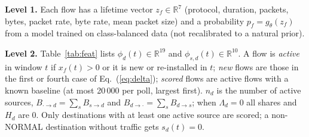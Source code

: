 \documentclass[conference]{IEEEtran}
\begin{document}
\textbf{Level 1.} Each flow has a lifetime vector $z_f\in\mathbb{R}^7$ (protocol, duration, packets, bytes, packet rate, byte rate, mean packet size) and a probability $p_f=g_\theta(z_f)$ from a model trained on class-balanced data (not recalibrated to a natural prior).

\textbf{Level 2.} Table~\ref{tab:feat} lists $\phi_d(t)\in\mathbb{R}^{19}$ and $\phi_{s,d}(t)\in\mathbb{R}^{10}$. A flow is \emph{active} in window $t$ if $x_f(t)>0$ or it is new or re-installed in $t$; \emph{new} flows are those in the first or fourth case of Eq.~(\ref{eq:delta}); \emph{scored} flows are active flows with a known baseline (at most 20\,000 per poll, largest first). $n_d$ is the number of active sources, $B_{\cdot\to d}=\sum_s B_{s\to d}$ and $B_{d\to\cdot}=\sum_s B_{d\to s}$; when $\Lambda_d=0$ all shares and $H_d$ are 0. Only destinations with at least one active source are scored; a non-NORMAL destination without traffic gets $s_d(t)=0$.
\end{document}
